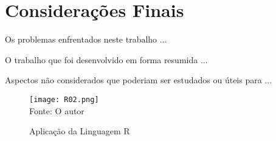 %



\chapter{Considera\c{c}\~{o}es Finais}


Os problemas enfrentados neste trabalho ...


O trabalho que foi desenvolvido em forma resumida ...

Aspectos n\~{a}o considerados que poderiam ser estudados ou \'{u}teis para ...



   \begin{figure}[H]
    \begin{center}
        \caption{Aplica\c{c}\~{a}o da Linguagem R} \label{ling2}
        \texttt{[image: R02.png]} \\
        {\tiny \sf Fonte: O autor }
    \end{center}
   \end{figure} 